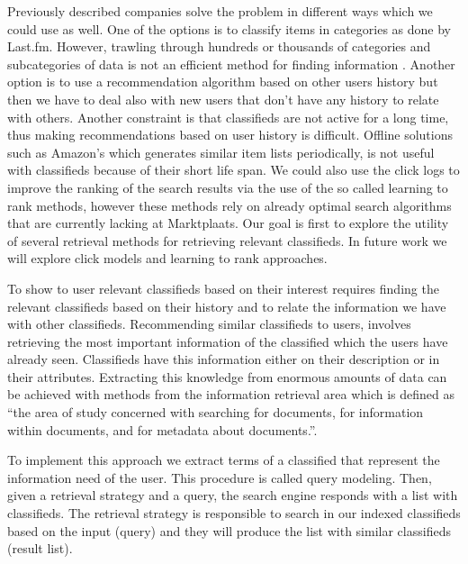 Previously described companies solve the problem in different ways which we could use as well. One of the options is to classify items in categories as done by Last.fm. However, trawling through hundreds or thousands of categories and subcategories of data is not an efficient method for finding information \cite{HatcherMcCandless}.  Another option is to use a recommendation algorithm based on other users history but then we have to deal also with new users that don't have any history to relate with others. Another constraint is that classifieds are not active for a long time, thus making recommendations based on user history is difficult. Offline solutions such as Amazon's which generates similar item lists periodically, is not useful with classifieds because of their short life span. We could also use the click logs to improve the ranking of the search results via the use of the so called learning to rank methods, however these methods rely on already optimal search algorithms that are currently lacking at Marktplaats. Our goal is first to explore the utility of several retrieval methods for retrieving relevant classifieds. In future work we will explore click models and learning to rank approaches.

To show to user relevant classifieds based on their interest requires finding the relevant classifieds based on their history and to relate the information we have with other classifieds. Recommending similar classifieds to users, involves retrieving the most important information of the classified which the users have already seen. Classifieds have this information either on their description or in their attributes. Extracting this knowledge from enormous amounts of data can be achieved with methods from the information retrieval area which is defined as ``the area of study concerned with searching for documents, for information within documents, and for metadata about documents.''\cite{SinghSingh}.

To implement this approach we extract terms of a classified that represent the information need of the user. This procedure is called query modeling. Then, given a retrieval strategy and a query, the search engine responds with a list with classifieds. The retrieval strategy is responsible to search in our indexed classifieds based on the input (query) and they will produce the list with similar classifieds (result list).

